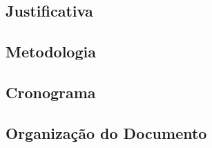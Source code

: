 \subsection{Justificativa}


\subsection{Metodologia}


\subsection{Cronograma}


\subsection{Organização do Documento}

